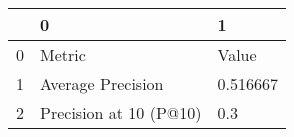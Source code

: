 \begin{tabular}{lll}
\toprule
{} &                       0 &         1 \\
\midrule
0 &                  Metric &     Value \\
1 &       Average Precision &  0.516667 \\
2 &  Precision at 10 (P@10) &       0.3 \\
\bottomrule
\end{tabular}
